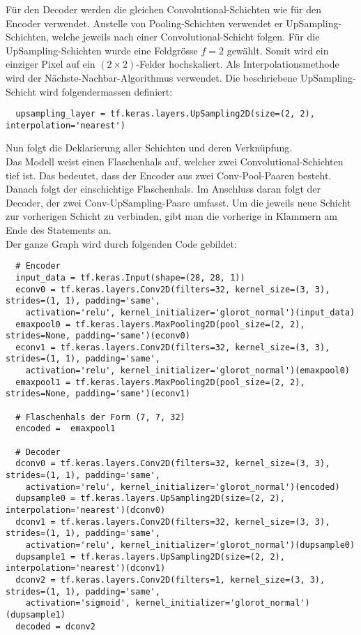 Für den Decoder werden die gleichen Convolutional-Schichten wie für den Encoder
verwendet. Anstelle von Pooling-Schichten verwendet er UpSampling-Schichten,
welche jeweils nach einer Convolutional-Schicht folgen.
Für die UpSampling-Schichten wurde eine Feldgrösse $f = 2$ gewählt. Somit wird
ein einziger Pixel auf ein $(2 \times 2)$-Felder hochskaliert.
Als Interpolationsmethode wird der Nächste-Nachbar-Algorithmus verwendet.
Die beschriebene UpSampling-Schicht wird folgendermassen definiert:
\begin{verbatim}
  upsampling_layer = tf.keras.layers.UpSampling2D(size=(2, 2), interpolation='nearest')
\end{verbatim}
Nun folgt die Deklarierung aller Schichten und deren Verknüpfung. \\
Das Modell weist einen Flaschenhals auf, welcher zwei Convolutional-Schichten
tief ist. Das bedeutet, dass der Encoder aus zwei
Conv-Pool-Paaren besteht. Danach folgt der einschichtige
Flaschenhals. Im Anschluss daran folgt der Decoder, der zwei
Conv-UpSampling-Paare umfasst.
Um die jeweils neue Schicht zur vorherigen Schicht zu verbinden, gibt man die
vorherige in Klammern am Ende des Statements an. \\
Der ganze Graph wird durch folgenden Code gebildet:
\begin{verbatim}
  # Encoder
  input_data = tf.keras.Input(shape=(28, 28, 1))
  econv0 = tf.keras.layers.Conv2D(filters=32, kernel_size=(3, 3), strides=(1, 1), padding='same',
    activation='relu', kernel_initializer='glorot_normal')(input_data)
  emaxpool0 = tf.keras.layers.MaxPooling2D(pool_size=(2, 2), strides=None, padding='same')(econv0)
  econv1 = tf.keras.layers.Conv2D(filters=32, kernel_size=(3, 3), strides=(1, 1), padding='same',
    activation='relu', kernel_initializer='glorot_normal')(emaxpool0)
  emaxpool1 = tf.keras.layers.MaxPooling2D(pool_size=(2, 2), strides=None, padding='same')(econv1)

  # Flaschenhals der Form (7, 7, 32)
  encoded =  emaxpool1

  # Decoder
  dconv0 = tf.keras.layers.Conv2D(filters=32, kernel_size=(3, 3), strides=(1, 1), padding='same',
    activation='relu', kernel_initializer='glorot_normal')(encoded)
  dupsample0 = tf.keras.layers.UpSampling2D(size=(2, 2), interpolation='nearest')(dconv0)
  dconv1 = tf.keras.layers.Conv2D(filters=32, kernel_size=(3, 3), strides=(1, 1), padding='same',
    activation='relu', kernel_initializer='glorot_normal')(dupsample0)
  dupsample1 = tf.keras.layers.UpSampling2D(size=(2, 2), interpolation='nearest')(dconv1)
  dconv2 = tf.keras.layers.Conv2D(filters=1, kernel_size=(3, 3), strides=(1, 1), padding='same',
    activation='sigmoid', kernel_initializer='glorot_normal')(dupsample1)
  decoded = dconv2
\end{verbatim}
